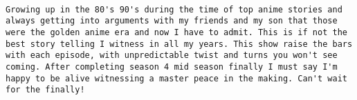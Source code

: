 \documentclass[
]{article}
\begin{document}
\begin{verbatim}
                                                                                                                                                                                                                                                                                                                                                                                                                                                                                                                                                                                                                                                                                                                                                                                                                                                                                                                                                                                                                                                                                                                                                                                                                                                                                                                                                                                                                                                                                                                                                                                                                                                                                                                                                                                                                                                                                                                                                                                                                                                                                                                                                                                                                                                                                                                                                                                                                                                                                                                                                                                                                                                                                                                                           Growing up in the 80's 90's during the time of top anime stories and always getting into arguments with my friends and my son that those were the golden anime era and now I have to admit. This is if not the best story telling I witness in all my years. This show raise the bars with each episode, with unpredictable twist and turns you won't see coming. After completing season 4 mid season finally I must say I'm happy to be alive witnessing a master peace in the making. Can't wait for the finally!

\end{verbatim}
\end{document}

